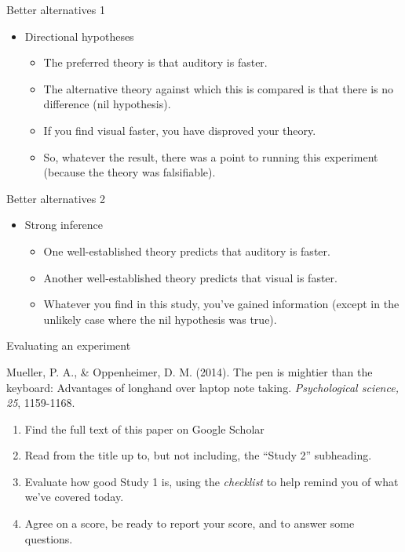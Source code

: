 \documentclass{beamer}
\begin{document}
\begin{frame}{Better alternatives 1}
\begin{itemize}
\item Directional hypotheses
\begin{itemize}
\item The preferred theory is that auditory is faster.
\item The alternative theory against which this is compared is that there is no difference (nil hypothesis).
\item If you find visual faster, you have disproved your theory.
\item So, whatever the result, there was a point to running this experiment (because the theory was falsifiable).
\end{itemize}
\end{itemize}
\end{frame}

\begin{frame}{Better alternatives 2}
\begin{itemize}
\item Strong inference
\begin{itemize}
\item One well-established theory predicts that auditory is faster.
\item Another well-established theory predicts that visual is faster.
\item Whatever you find in this study, you've gained information (except in the unlikely case where the nil hypothesis was true).
\end{itemize}
\end{itemize}
\end{frame}

\begin{frame}{Evaluating an experiment}

  Mueller, P. A., \& Oppenheimer, D. M. (2014). The pen is mightier than the keyboard: Advantages of longhand over laptop note taking. \emph{Psychological science, 25}, 1159-1168.

  \vspace{12pt}
  
\begin{enumerate}
\item Find the full text of this paper on Google Scholar
\item Read from the title up to, but not including, the ``Study 2'' subheading.
\item Evaluate how good Study 1 is, using the \emph{checklist} to help remind you of what we've covered today.
\item Agree on a score, be ready to report your score, and to answer some questions.
\end{enumerate}
\end{frame}
\end{document}
